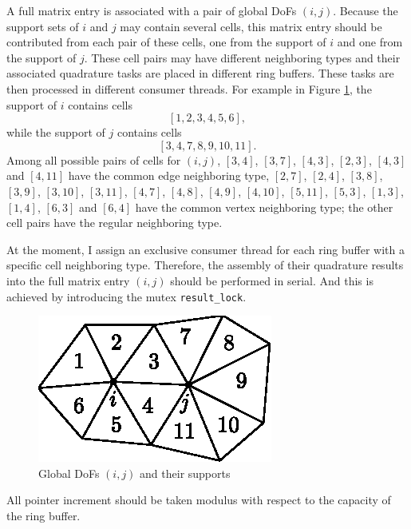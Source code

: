 \documentclass[11pt, a4paper]{article}
\begin{document}
\begin{itemize}
\begin{itemize}
    A full matrix entry is associated with a pair of global DoFs $(i, j)$. Because the
    support sets of $i$ and $j$ may contain several cells, this matrix entry should be
    contributed from each pair of these cells, one from the support of $i$ and one from
    the support of $j$. These cell pairs may have different neighboring types and their
    associated quadrature tasks are placed in different ring buffers. These tasks are then
    processed in different consumer threads. For example in Figure
    \ref{fig:dofs-and-supports}, the support of $i$ contains cells
    $$
    [1,2,3,4,5,6],
    $$
    while the support of $j$ contains cells
    $$
    [3,4,7,8,9,10,11].
    $$
    Among all possible pairs of cells for $(i, j)$, $[3, 4]$, $[3, 7]$, $[4,3]$, $[2, 3]$,
    $[4, 3]$ and $[4, 11]$ have the common edge neighboring type, $[2, 7]$, $[2, 4]$,
    $[3, 8]$, $[3, 9]$, $[3, 10]$, $[3, 11]$, $[4, 7]$, $[4, 8]$, $[4, 9]$, $[4, 10]$,
    $[5, 11]$, $[5, 3]$, $[1, 3]$, $[1, 4]$, $[6, 3]$ and $[6, 4]$ have the common vertex
    neighboring type; the other cell pairs have the regular neighboring type.
    
    At the moment, I assign an exclusive consumer thread for each ring buffer with a
    specific cell neighboring type. Therefore, the assembly of their quadrature results
    into the full matrix entry $(i, j)$ should be performed in serial. And this is
    achieved by introducing the mutex \texttt{result\_lock}.

    \begin{figure}[htbp]
      \centering
      \includegraphics{figures/2023-06-21-dofs-and-supports}
      \caption{Global DoFs $(i, j)$ and their supports}
      \label{fig:dofs-and-supports}
    \end{figure}
  \end{itemize}
\end{itemize}

\begin{mycomment}
  All pointer increment should be taken modulus with respect to the capacity of the ring buffer.
\end{mycomment}
\end{document}
